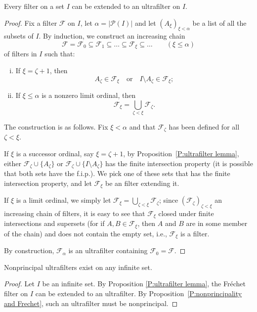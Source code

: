 \documentclass{scrartcl}
\newcommand{\SF}{\mathscr{F}}
\newcommand{\SP}{\mathscr{P}}
\begin{document}
\begin{corollary}
\label{C:ultrafilter theorem}
Every filter on a set $I$ can be extended to an ultrafilter on $I$.
\end{corollary}

\begin{proof}
Fix a filter $\SF$ on $I$,  let $\alpha=|\SP(I)|$ and let $(A_\xi)_{\xi<\alpha}$ be a list of all the subsets of $I$. By induction, we construct an increasing chain 
\[
\SF=\SF_0\subseteq \SF_1\subseteq \dots\subseteq \SF_\xi\subseteq \dots\qquad (\xi\le\alpha)
\]
of filters in $I$  such that:
\begin{enumerate}[i)]
\item If $\xi = \zeta +1$, then 
\[
A_\zeta\in \SF_\xi
\quad\text{or}\quad
I\setminus A_\zeta\in \SF_\xi;
\]
\item If $\xi\le\alpha$ is a nonzero limit ordinal, then
\[
\SF_\xi = \bigcup_{\zeta <\xi} \SF_\zeta\text{.}
\]
\end{enumerate}

The construction is as follows. Fix $\xi<\alpha$ and that $\SF_\zeta$ has been defined for all $\zeta<\xi$. 

If $\xi$ is a successor ordinal, say $\xi=\zeta+1$, by Proposition~\ref{P:ultrafilter lemma},
either $\SF_\zeta \cup \{A_\zeta\}$ or $\SF_\zeta \cup \{I\setminus A_\zeta\}$ has the finite intersection property (it is possible that both sets have the f.i.p.).
We pick one of these sets that has the finite intersection property, and let $\SF_\xi$ be an filter extending it. 

If $\xi$ is a limit ordinal, we simply let $\SF_\xi = \bigcup_{\zeta<\xi}\SF_\zeta$; since $(\SF_\zeta)_{\zeta<\xi}$  an increasing chain of filters, it is easy to see that $\SF_\xi$ closed under finite intersections and supersets (for if $A,B\in \SF_\xi$, then $A$ and $B$ are in some member of the chain) and does not contain the empty set, i.e., $\SF_\xi$ is a filter. 

By construction, $\SF_\alpha$ is an ultrafilter containing $\SF_0=\SF$.

\end{proof}

\begin{corollary}
\label{C:nonprincipal ultrafilters exist}
Nonprincipal ultrafilters exist on any infinite set.
\end{corollary}

\begin{proof}
Let $I$ be an infinite set. By Proposition \ref{P:ultrafilter lemma}, the Fr\'echet filter on $I$ can be extended to an ultrafilter. By Proposition~\ref{P:nonprincipality and Frechet}, such an ultrafilter must be nonprincipal. 
\end{proof}
\end{document}
